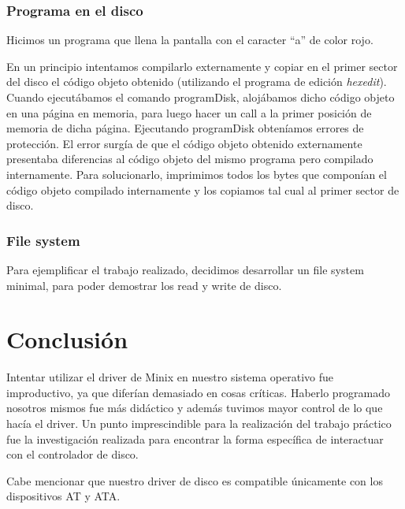 \documentclass[a4paper,10pt]{article}
\begin{document}
  \subsubsection{Programa en el disco}
    Hicimos un programa que llena la pantalla con el caracter ``a'' de color rojo.\par
    En un principio intentamos compilarlo externamente y copiar en el primer sector del disco el código objeto obtenido
    (utilizando el programa de edición \emph{hexedit}). Cuando ejecutábamos el comando programDisk, alojábamos dicho código objeto
    en una página en memoria, para luego hacer un call a la primer posición de memoria de dicha página.	Ejecutando programDisk 
    obteníamos errores de protección. El error surgía de que el código objeto obtenido externamente presentaba diferencias al código
    objeto del mismo programa pero compilado internamente. Para solucionarlo, imprimimos todos los bytes que componían el código objeto
    compilado internamente y los copiamos tal cual al primer sector de disco.
    

  \subsubsection{File system}
  Para ejemplificar el trabajo realizado, decidimos desarrollar un file system minimal, para poder demostrar los read y write de disco.

\newpage

\section{Conclusión}
Intentar utilizar el driver de Minix en nuestro sistema operativo fue improductivo, ya que diferían demasiado en cosas críticas. Haberlo 
programado nosotros mismos fue más didáctico y además tuvimos mayor control de lo que hacía el driver. Un punto imprescindible para la realización 
del trabajo práctico fue la investigación realizada para encontrar la forma específica de interactuar con el controlador de disco. \par
\par
Cabe mencionar que nuestro driver de disco es compatible únicamente con los dispositivos AT y ATA. 
  
\end{document}
